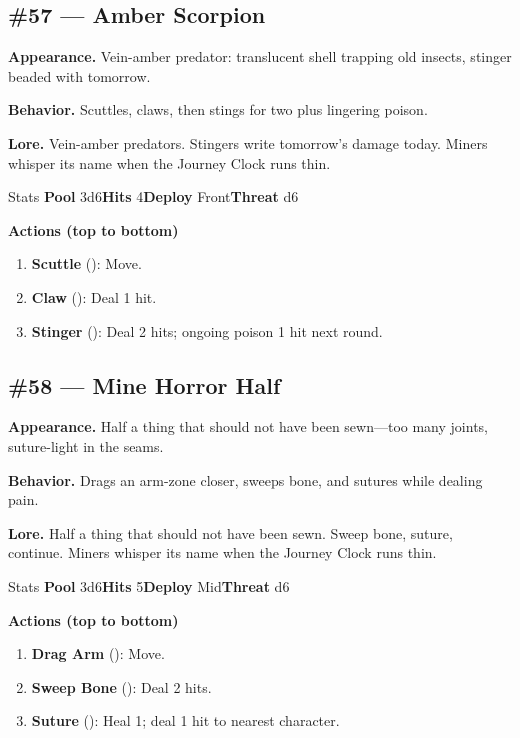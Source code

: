 \subsection*{\#57 --- Amber Scorpion}

\textbf{Appearance.} Vein-amber predator: translucent shell trapping old insects, stinger beaded with tomorrow.

\textbf{Behavior.} Scuttles, claws, then stings for two plus lingering poison.

\textbf{Lore.} Vein-amber predators. Stingers write tomorrow's damage today. Miners whisper its name when the Journey Clock runs thin.

\begin{monsterentry}{Stats}
\textbf{Pool} 3d6\quad\textbf{Hits} 4\quad\textbf{Deploy} Front\quad\textbf{Threat} d6

\textbf{Actions (top to bottom)}
\begin{enumerate}\setlength{\itemsep}{0.15em}\setlength{\parskip}{0pt}
  \item \textbf{Scuttle} (\easy): Move.
  \item \textbf{Claw} (\medium): Deal 1 hit.
  \item \textbf{Stinger} (\hard): Deal 2 hits; ongoing poison 1 hit next round.
\end{enumerate}
\end{monsterentry}

\subsection*{\#58 --- Mine Horror Half}

\textbf{Appearance.} Half a thing that should not have been sewn---too many joints, suture-light in the seams.

\textbf{Behavior.} Drags an arm-zone closer, sweeps bone, and sutures while dealing pain.

\textbf{Lore.} Half a thing that should not have been sewn. Sweep bone, suture, continue. Miners whisper its name when the Journey Clock runs thin.

\begin{monsterentry}{Stats}
\textbf{Pool} 3d6\quad\textbf{Hits} 5\quad\textbf{Deploy} Mid\quad\textbf{Threat} d6

\textbf{Actions (top to bottom)}
\begin{enumerate}\setlength{\itemsep}{0.15em}\setlength{\parskip}{0pt}
  \item \textbf{Drag Arm} (\easy): Move.
  \item \textbf{Sweep Bone} (\medium): Deal 2 hits.
  \item \textbf{Suture} (\hard): Heal 1; deal 1 hit to nearest character.
\end{enumerate}
\end{monsterentry}

